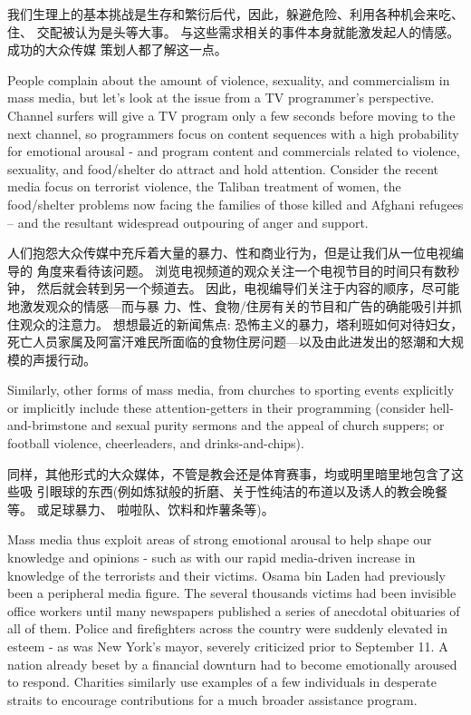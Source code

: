 \documentclass[cs4size, a4paper, 12pt]{article}
\newcounter{numpar}
\newcommand*{\newpar}{\numpar{}}
\begin{document}
	我们生理上的基本挑战是生存和繁衍后代，因此，躲避危险、利用各种机会来吃、住、 交配被认为是头等大事。 与这些需求相关的事件本身就能激发起人的情感。  成功的大众传媒 策划人都了解这一点。 
	
	\newpar People complain about the amount of violence, sexuality, and commercialism in mass media, but let's look at the issue from a TV programmer's perspective. Channel surfers will give a TV program only a few seconds before moving to the next channel, so programmers focus on content  sequences with a high probability for emotional arousal - and program content and commercials related to violence, sexuality, and food/shelter do attract and hold attention. Consider the recent media focus on terrorist violence, the Taliban treatment of women, the food/shelter problems now facing the families of those killed and Afghani refugees -- and the resultant widespread outpouring of anger and support. 
	
	人们抱怨大众传媒中充斥着大量的暴力、性和商业行为，但是让我们从一位电视编导的 角度来看待该问题。  浏览电视频道的观众关注一个电视节目的时间只有数秒钟， 然后就会转到另一个频道去。 因此，电视编导们关注于内容的顺序，尽可能地激发观众的情感—而与暴 力、性、食物/住房有关的节目和广告的确能吸引并抓住观众的注意力。 想想最近的新闻焦点: 恐怖主义的暴力，塔利班如何对待妇女，死亡人员家属及阿富汗难民所面临的食物住房问题—以及由此进发出的怒潮和大规模的声援行动。  
	
	\newpar Similarly, other forms of mass media, from churches to sporting events explicitly or implicitly include these attention-getters in their programming (consider hell-and-brimstone and sexual purity sermons and the appeal of church suppers; or football violence, cheerleaders, and drinks-and-chips). 
	
	同样，其他形式的大众媒体，不管是教会还是体育赛事，均或明里暗里地包含了这些吸 引眼球的东西(例如炼狱般的折磨、关于性纯洁的布道以及诱人的教会晚餐等。 或足球暴力、 啦啦队、饮料和炸薯条等)。  
	
	\newpar Mass media thus exploit areas of strong emotional arousal to help shape our knowledge and opinions - such as with our rapid media-driven  increase in knowledge of the terrorists and their victims. Osama bin Laden had previously been a peripheral media figure. The several thousands victims had been invisible office workers until many newspapers published a series of anecdotal obituaries of all of them. Police and firefighters across the country were suddenly elevated in esteem - as was New York's mayor, severely criticized prior to September 11. A nation already beset by a financial downturn had to become emotionally aroused to respond. Charities similarly use examples of a few individuals in desperate straits to encourage contributions for a much broader assistance program. 
	
\end{document}
